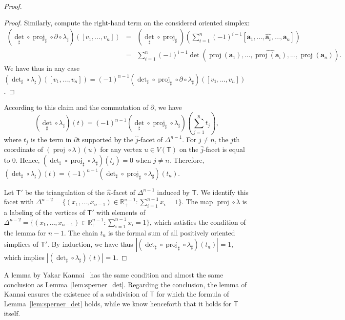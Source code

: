 \documentclass[12pt]{amsart}
\theoremstyle{definition}
\theoremstyle{remark}
\def\R{\mathbb{R}}
\def\T{\mathsf{T}}
\def\aa{\boldsymbol{a}}
\def\ds{\displaystyle}
\def\det{\operatorname{det}}
\def\proj{\operatorname{proj}}
\begin{document}
\begin{proof}
\begin{proof}
Similarly, compute the right-hand term on the considered oriented simplex: 
$$\begin{array}{rcl}
(\det_{\sharp}\circ \proj_{\sharp}\circ\partial\circ\lambda_{\sharp})([v_1,\ldots,v_n]) & = & 
\ds{(\det_{\sharp}\circ \proj_{\sharp})\left(\sum_{i=1}^n(-1)^{i-1}[\aa_1,\ldots,\widehat{\aa_i},\ldots,\aa_n]\right)} \\
& = & \ds{\sum_{i=1}^n(-1)^{i-1}\det\left(\proj(\aa_1),\ldots,\widehat{\proj(\aa_i)},\ldots,\proj(\aa_n)\right)}.
\end{array}
$$
We have thus in any case $(\det_{\sharp}\circ\lambda_{\sharp})([v_1,\ldots,v_n])=(-1)^{n-1}(\det_{\sharp}\circ \proj_{\sharp}\circ\partial\circ\lambda_{\sharp})([v_1,\ldots,v_n])$.
\end{proof}

According to this claim and the commutation of $\partial$, we have
$$(\det_{\sharp}\circ\lambda_{\sharp})(t)=(-1)^{n-1}(\det_{\sharp}\circ \proj_{\sharp}\circ \lambda_{\sharp})\left(\sum_{j=1}^nt_j\right),$$
where $t_j$ is the term in $\partial t$ supported by the $\widehat{j}$-facet of $\Delta^{n-1}$. For $j\neq n$, the $j$th coordinate of $(\proj\circ\lambda)(u)$ for any vertex $u\in V(\T)$ on the $\widehat{j}$-facet is equal to $0$. Hence, $(\det_{\sharp}\circ \proj_{\sharp}\circ \lambda_{\sharp})(t_j)=0$ when $j\neq n$. Therefore,  $(\det_{\sharp}\circ\lambda_{\sharp})(t)=(-1)^{n-1}(\det_{\sharp}\circ \proj_{\sharp}\circ \lambda_{\sharp})(t_n)$.

Let $\T'$ be the triangulation of the $\widehat{n}$-facet of $\Delta^{n-1}$ induced by $\T$. We identify this facet with $\Delta^{n-2}=\{(x_1,\ldots,x_{n-1})\in\R_+^{n-1}\colon\sum_{i=1}^{n-1}x_i=1\}$. The map $\proj\circ\lambda$ is a labeling of the vertices of $\T'$ with elements of $\Delta^{n-2}=\{(x_1,\ldots,x_{n-1})\in\R_+^{n-1}\colon\sum_{i=1}^{n-1}x_i=1\}$, which satisfies the condition of the lemma for $n-1$. The chain $t_n$ is the formal sum of all positively oriented simplices of $\T'$. By induction, we have thus  $\left|(\det_{\sharp}\circ\proj_{\sharp}\circ \lambda_{\sharp})(t_n)\right|=1$, which implies %
$\left|(\det_{\sharp}\circ \lambda_{\sharp})(t)\right|=1$.
\end{proof}

A lemma by Yakar Kannai~\cite[Lemma 3]{kannai2013using} has the same condition and almost the same conclusion as Lemma~\ref{lem:sperner_det}. Regarding the conclusion, the lemma of Kannai ensures the existence of a subdivision of $\T$ for which the formula of Lemma~\ref{lem:sperner_det} holds, while we know henceforth that it holds for $\T$ itself.
\end{document}
